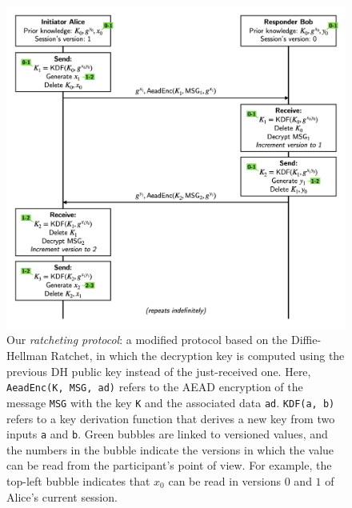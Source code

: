 \begin{figure}
    \centering
    \includegraphics[width=1.0\textwidth]{figures/DH-ratchet-modified.png}
    \caption{Our \emph{ratcheting protocol}: a modified protocol based on the Diffie-Hellman Ratchet, in which the decryption key is computed using the previous DH public key instead of the just-received one.
    Here, \texttt{AeadEnc(K, MSG, ad)} refers to the AEAD encryption of the message \texttt{MSG} with the key \texttt{K} and the associated data \texttt{ad}. \texttt{KDF(a, b)} refers to a key derivation function that derives a new key from two inputs \texttt{a} and \texttt{b}.
    Green bubbles are linked to versioned values, and the numbers in the bubble indicate the versions in which the value can be read from the participant's point of view. For example, the top-left bubble indicates that $x_0$ can be read in versions $0$ and $1$ of Alice's current session.}
    \label{fig:dh-ratchet-modified}
\end{figure}


